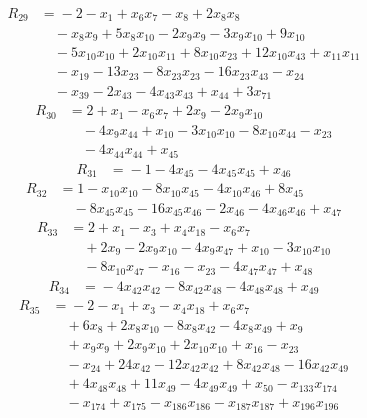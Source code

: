 \begin{align*}
R_{29}&={}-2 -x_{1} +x_{6}x_{7} -x_{8} +2x_{8}x_{8}\\
&\quad{}-x_{8}x_{9} +5x_{8}x_{10} -2x_{9}x_{9} -3x_{9}x_{10} +9x_{10}\\
&\quad{}-5x_{10}x_{10} +2x_{10}x_{11} +8x_{10}x_{23} +12x_{10}x_{43} +x_{11}x_{11}\\
&\quad{}-x_{19} -13x_{23} -8x_{23}x_{23} -16x_{23}x_{43} -x_{24}\\
&\quad{}-x_{39} -2x_{43} -4x_{43}x_{43} +x_{44} +3x_{71}
\end{align*}
\begin{align*}
R_{30}&={}2 +x_{1} -x_{6}x_{7} +2x_{9} -2x_{9}x_{10}\\
&\quad{}-4x_{9}x_{44} +x_{10} -3x_{10}x_{10} -8x_{10}x_{44} -x_{23}\\
&\quad{}-4x_{44}x_{44} +x_{45}
\end{align*}
\begin{align*}
R_{31}&={}-1 -4x_{45} -4x_{45}x_{45} +x_{46}
\end{align*}
\begin{align*}
R_{32}&={}1 -x_{10}x_{10} -8x_{10}x_{45} -4x_{10}x_{46} +8x_{45}\\
&\quad{}-8x_{45}x_{45} -16x_{45}x_{46} -2x_{46} -4x_{46}x_{46} +x_{47}
\end{align*}
\begin{align*}
R_{33}&={}2 +x_{1} -x_{3} +x_{4}x_{18} -x_{6}x_{7}\\
&\quad{}+2x_{9} -2x_{9}x_{10} -4x_{9}x_{47} +x_{10} -3x_{10}x_{10}\\
&\quad{}-8x_{10}x_{47} -x_{16} -x_{23} -4x_{47}x_{47} +x_{48}
\end{align*}
\begin{align*}
R_{34}&={}-4x_{42}x_{42} -8x_{42}x_{48} -4x_{48}x_{48} +x_{49}
\end{align*}
\begin{align*}
R_{35}&={}-2 -x_{1} +x_{3} -x_{4}x_{18} +x_{6}x_{7}\\
&\quad{}+6x_{8} +2x_{8}x_{10} -8x_{8}x_{42} -4x_{8}x_{49} +x_{9}\\
&\quad{}+x_{9}x_{9} +2x_{9}x_{10} +2x_{10}x_{10} +x_{16} -x_{23}\\
&\quad{}-x_{24} +24x_{42} -12x_{42}x_{42} +8x_{42}x_{48} -16x_{42}x_{49}\\
&\quad{}+4x_{48}x_{48} +11x_{49} -4x_{49}x_{49} +x_{50} -x_{133}x_{174}\\
&\quad{}-x_{174} +x_{175} -x_{186}x_{186} -x_{187}x_{187} +x_{196}x_{196}
\end{align*}
